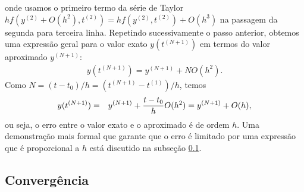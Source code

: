 onde usamos o primeiro termo da série de Taylor $hf(y^{(2)}+O(h^2),t^{(2)})=hf(y^{(2)},t^{(2)})+O(h^3)$ na passagem da segunda para terceira linha. Repetindo sucessivamente o passo anterior, obtemos uma expressão geral para o valor exato $y(t^{(N+1)})$ em termos do valor aproximado $y^{(N+1)}$:
\begin{eqnarray*}
 y(t^{(N+1)})=y^{(N+1)}+N O(h^2) .
\end{eqnarray*}
Como $N=(t-t_0)/h=(t^{(N+1)}-t^{(1)})/h$, temos
\begin{eqnarray}{\label{euler_precisao}}
 y(t^{(N+1)})&=&y^{(N+1)}+\frac{t-t_0}{h}O(h^2)=y^{(N+1)}+O(h),
\end{eqnarray}
ou seja, o erro entre o valor exato e o aproximado é de ordem $h$. Uma demonstração mais formal que garante que o erro é limitado por uma expressão que é proporcional a $h$ está discutido na subseção \ref{sec_conv_Euler}.

\subsection{Convergência}\label{sec_conv_Euler}

